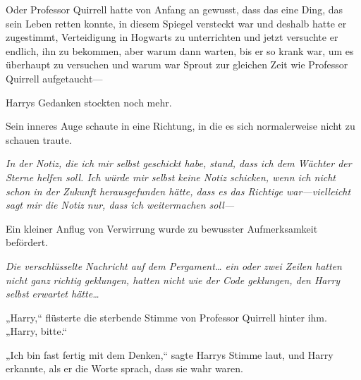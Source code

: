 Oder Professor Quirrell hatte von Anfang an gewusst, dass das eine Ding, das sein Leben retten konnte, in diesem Spiegel versteckt war und deshalb hatte er zugestimmt, Verteidigung in Hogwarts zu unterrichten und jetzt versuchte er endlich, ihn zu bekommen, aber warum dann warten, bis er so krank war, um es überhaupt zu versuchen und warum war Sprout zur gleichen Zeit wie Professor Quirrell aufgetaucht—

Harrys Gedanken stockten noch mehr.

Sein inneres Auge schaute in eine Richtung, in die es sich normalerweise nicht zu schauen traute.

\emph{In der Notiz, die ich mir selbst geschickt habe, stand, dass ich dem Wächter der Sterne helfen soll. Ich würde mir selbst keine Notiz schicken, wenn ich nicht schon in der Zukunft herausgefunden hätte, dass es das Richtige war—vielleicht sagt mir die Notiz nur, dass ich weitermachen soll—}

Ein kleiner Anflug von Verwirrung wurde zu bewusster Aufmerksamkeit befördert.

\emph{Die verschlüsselte Nachricht auf dem Pergament… ein oder zwei Zeilen hatten nicht ganz richtig geklungen, hatten nicht wie der Code geklungen, den Harry selbst erwartet hätte…}

„Harry,“ flüsterte die sterbende Stimme von Professor Quirrell hinter ihm. „Harry, bitte.“

„Ich bin fast fertig mit dem Denken,“ sagte Harrys Stimme laut, und Harry erkannte, als er die Worte sprach, dass sie wahr waren.

